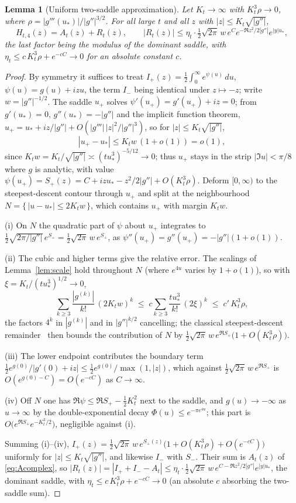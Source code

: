 \documentclass[11pt,reqno]{amsart}
\theoremstyle{plain}
\newtheorem{lemma}[theorem]{Lemma}
\theoremstyle{definition}
\theoremstyle{remark}
\begin{document}
\begin{lemma}[Uniform two-saddle approximation]\label{lem:twosaddle}
Let $K_t\to\infty$ with $K_t^3\rho\to0$, where $\rho=|g'''(u_*)|/|g''|^{3/2}$. For
all large $t$ and all $z$ with $|z|\le K_t\sqrt{|g''|}$,
\[
   H_{t,4}(z)=A_t(z)+R_t(z),\qquad
   |R_t(z)|\le \eta_t\cdot\tfrac12\sqrt{2\pi}\,w\,e^{C}e^{-\Re z^2/2|g''|}e^{|y|u_*},
\]
the last factor being the modulus of the dominant saddle, with
$\eta_t\le c\,K_t^3\rho+e^{-cC}\to0$ for an absolute constant $c$.
\end{lemma}

\begin{proof}
By symmetry it suffices to treat $I_+(z)=\tfrac12\int_0^\infty e^{\psi(u)}\,du$,
$\psi(u)=g(u)+izu$, the term $I_-$ being identical under $z\mapsto-z$; write
$w=|g''|^{-1/2}$. The saddle $u_+$ solves $\psi'(u_+)=g'(u_+)+iz=0$; from
$g'(u_*)=0$, $g''(u_*)=-|g''|$ and the implicit function theorem,
$u_+=u_*+iz/|g''|+O(|g'''|\,|z|^2/|g''|^3)$, so for $|z|\le K_t\sqrt{|g''|}$,
\[
   |u_+-u_*|\le K_t w\,(1+o(1))=o(1),
\]
since $K_t w=K_t/\sqrt{|g''|}\asymp(tu_*^3)^{-5/12}\to0$; thus $u_+$ stays in the
strip $|\Im u|<\pi/8$ where $g$ is analytic, with value
$\psi(u_+)=S_+(z)=C+izu_*-z^2/2|g''|+O(K_t^3\rho)$. Deform $[0,\infty)$ to the
steepest-descent contour through $u_+$ and split at the neighbourhood
$N=\{\,|u-u_*|\le 2K_t w\,\}$, which contains $u_+$ with margin $K_t w$.

(i) On $N$ the quadratic part of $\psi$ about $u_+$ integrates to
$\tfrac12\sqrt{2\pi/|g''|}\,e^{S_+}=\tfrac12\sqrt{2\pi}\,w\,e^{S_+}$, as
$\psi''(u_+)=g''(u_+)=-|g''|(1+o(1))$.

(ii) The cubic and higher terms give the relative error. The scalings of
Lemma~\ref{lem:scale} hold throughout $N$ (where $e^{4u}$ varies by $1+o(1)$), so
with $\xi=K_t/(tu_*^3)^{1/2}\to0$,
\[
   \sum_{k\ge3}\frac{|g^{(k)}|}{k!}\,(2K_t w)^k
   \;\le\; c\sum_{k\ge3}\frac{tu_*^3}{k!}\,(2\xi)^k\;\le\; c'\,K_t^3\rho,
\]
the factors $4^k$ in $|g^{(k)}|$ and in $|g''|^{k/2}$ cancelling; the classical
steepest-descent remainder~\cite{Olver} then bounds the contribution of $N$ by
$\tfrac12\sqrt{2\pi}\,w\,e^{\Re S_+}\bigl(1+O(K_t^3\rho)\bigr)$.

(iii) The lower endpoint contributes the boundary term
$\tfrac12 e^{g(0)}/|g'(0)+iz|\le\tfrac12 e^{g(0)}/\max(1,|z|)$, which against
$\tfrac12\sqrt{2\pi}\,w\,e^{\Re S_+}$ is $O(e^{g(0)-C})=O(e^{-cC})$ as
$C\to\infty$.

(iv) Off $N$ one has $\Re\psi\le\Re S_+-\tfrac12 K_t^2$ next to the saddle, and
$g(u)\to-\infty$ as $u\to\infty$ by the double-exponential decay
$\Phi(u)\le e^{-\pi e^{4u}}$; this part is $O\!\bigl(e^{\Re S_+}e^{-K_t^2/2}\bigr)$,
negligible against (i).

Summing (i)--(iv), $I_+(z)=\tfrac12\sqrt{2\pi}\,w\,e^{S_+(z)}\bigl(1+O(K_t^3\rho)
+O(e^{-cC})\bigr)$ uniformly for $|z|\le K_t\sqrt{|g''|}$, and likewise $I_-$ with
$S_-$. Their sum is $A_t(z)$ of \eqref{eq:Acomplex}, so
$|R_t(z)|=|I_++I_--A_t|\le\eta_t\cdot\tfrac12\sqrt{2\pi}\,w\,e^{C-\Re z^2/2|g''|}
e^{|y|u_*}$, the dominant saddle, with $\eta_t\le c\,K_t^3\rho+e^{-cC}\to0$ (an
absolute $c$ absorbing the two-saddle sum).
\end{proof}
\end{document}
